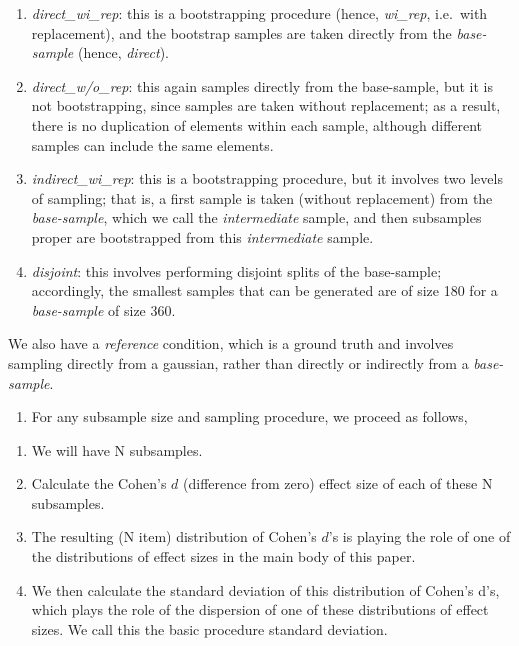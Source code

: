 \documentclass[
]{article}
\providecommand{\tightlist}{%
  \setlength{\itemsep}{0pt}\setlength{\parskip}{0pt}}
\begin{document}
\begin{enumerate}
\def\labelenumi{\alph{enumi}.}
\item
  \emph{direct\_wi\_rep}: this is a bootstrapping procedure (hence,
  \emph{wi\_rep}, i.e.~with replacement), and the bootstrap samples are
  taken directly from the \emph{base-sample} (hence, \emph{direct}).
\item
  \emph{direct\_w/o\_rep}: this again samples directly from the
  base-sample, but it is not bootstrapping, since samples are taken
  without replacement; as a result, there is no duplication of elements
  within each sample, although different samples can include the same
  elements.
\item
  \emph{indirect\_wi\_rep}: this is a bootstrapping procedure, but it
  involves two levels of sampling; that is, a first sample is taken
  (without replacement) from the \emph{base-sample}, which we call the
  \emph{intermediate} sample, and then subsamples proper are
  bootstrapped from this \emph{intermediate} sample.
\item
  \emph{disjoint}: this involves performing disjoint splits of the
  base-sample; accordingly, the smallest samples that can be generated
  are of size 180 for a \emph{base-sample} of size 360.
\end{enumerate}

We also have a \emph{reference} condition, which is a ground truth and
involves sampling directly from a gaussian, rather than directly or
indirectly from a \emph{base-sample}.

\begin{enumerate}
\def\labelenumi{\arabic{enumi}.}
\setcounter{enumi}{3}
\tightlist
\item
  For any subsample size and sampling procedure, we proceed as follows,
\end{enumerate}

\begin{enumerate}
\def\labelenumi{\alph{enumi}.}
\item
  We will have N subsamples.
\item
  Calculate the Cohen's \(d\) (difference from zero) effect size of each
  of these N subsamples.
\item
  The resulting (N item) distribution of Cohen's \(d\)'s is playing the
  role of one of the distributions of effect sizes in the main body of
  this paper.
\item
  We then calculate the standard deviation of this distribution of
  Cohen's d's, which plays the role of the dispersion of one of these
  distributions of effect sizes. We call this the basic procedure
  standard deviation.
\end{enumerate}
\end{document}
